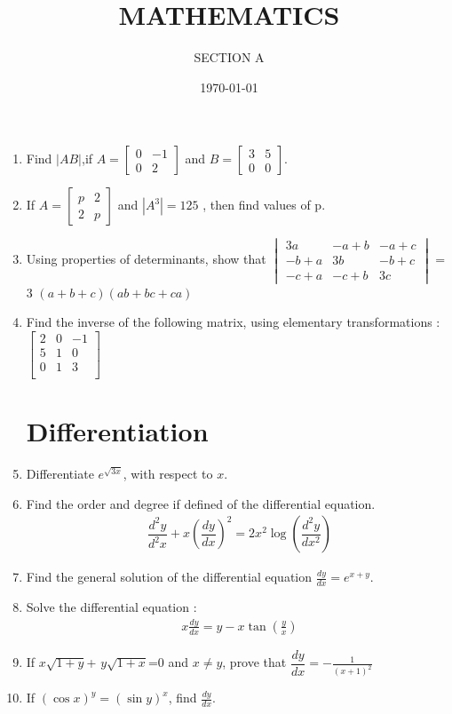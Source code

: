 \documentclass[2pt,-letter paper]{article}
\title{MATHEMATICS}
\author{SECTION A}
\date{\today}
\providecommand{\myvec}[1]{\ensuremath{\begin{bmatrix}#1\end{bmatrix}}}
\providecommand{\brak}[1]{\ensuremath{\left(#1\right)}}
\begin{document}
\maketitle

\begin{enumerate}
\section{Matrix}
\item Find $|AB|$,if $A = \myvec{0 & -1 \\ 0 & 2}$ and $B = \myvec{3 & 5 \\ 0 & 0}$.
\item If $A = \myvec{p & 2 \\ 2 & p}$ and $|A^3| = 125$
, then find values of p.
\item Using properties of determinants, show that      $\begin{vmatrix}                                   
3a & -a + b & -a + c \\ -b + a & 3b & -b + c \\-c + a & -c + b & 3c\end{vmatrix}$ = 3 \brak{a + b + c}\brak{ab + bc + ca}
\item Find the inverse of the following matrix, using elementary transformations :                              $\begin{bmatrix}                                         2 & 0 & -1 \\                                          5 & 1 & 0 \\                                            0 & 1 & 3 \\                                          \end{bmatrix}$
\section{Differentiation}
\item Differentiate $e^{\sqrt{3x}}$, with respect to ${x}$.
\item Find the order and degree if defined of the differential equation. 
\begin{align*}
 \dfrac{d^2y}{d^2x}+x\brak{\dfrac{dy}{dx}}^2=2x^2\log\brak{\dfrac{d^2y}{dx^2}}
\end{align*}
\item Find the general solution of the differential equation $\frac{dy}{dx} = e^{x+y}$.
\item Solve the differential equation :                \begin{align*}  x\frac{dy}{dx} = y - x\tan{\brak{\frac{y}{x}}}  \end{align*}
\item If $x\sqrt{1+y}$+ $y\sqrt{1+x}$=0 and $x\neq y$,   prove that $\dfrac{dy}{dx} = -\frac{1}{\brak{x+1}^2}$
\item If $\brak{\cos x}^y = \brak{\sin y}^x$, find $\frac{dy}{dx}$.

\end{enumerate}
\end{document}
